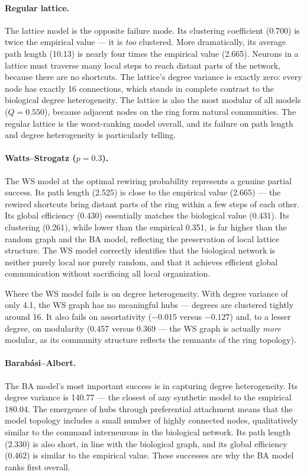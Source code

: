 \documentclass[12pt,a4paper]{report}
\begin{document}
\paragraph{Regular lattice.} The lattice model is the opposite failure mode. Its clustering coefficient (0.700) is twice the empirical value — it is \textit{too} clustered. More dramatically, its average path length (10.13) is nearly four times the empirical value (2.665). Neurons in a lattice must traverse many local steps to reach distant parts of the network, because there are no shortcuts. The lattice's degree variance is exactly zero: every node has exactly 16 connections, which stands in complete contrast to the biological degree heterogeneity. The lattice is also the most modular of all models ($Q = 0.550$), because adjacent nodes on the ring form natural communities. The regular lattice is the worst-ranking model overall, and its failure on path length and degree heterogeneity is particularly telling.

\paragraph{Watts--Strogatz ($p = 0.3$).} The WS model at the optimal rewiring probability represents a genuine partial success. Its path length (2.525) is close to the empirical value (2.665) — the rewired shortcuts bring distant parts of the ring within a few steps of each other. Its global efficiency (0.430) essentially matches the biological value (0.431). Its clustering (0.261), while lower than the empirical 0.351, is far higher than the random graph and the BA model, reflecting the preservation of local lattice structure. The WS model correctly identifies that the biological network is neither purely local nor purely random, and that it achieves efficient global communication without sacrificing all local organization.

Where the WS model fails is on degree heterogeneity. With degree variance of only 4.1, the WS graph has no meaningful hubs — degrees are clustered tightly around 16. It also fails on assortativity ($-0.015$ versus $-0.127$) and, to a lesser degree, on modularity (0.457 versus 0.369 — the WS graph is actually \textit{more} modular, as its community structure reflects the remnants of the ring topology).

\paragraph{Barab\'{a}si--Albert.} The BA model's most important success is in capturing degree heterogeneity. Its degree variance is 140.77 — the closest of any synthetic model to the empirical 180.04. The emergence of hubs through preferential attachment means that the model topology includes a small number of highly connected nodes, qualitatively similar to the command interneurons in the biological network. Its path length (2.330) is also short, in line with the biological graph, and its global efficiency (0.462) is similar to the empirical value. These successes are why the BA model ranks first overall.
\end{document}

